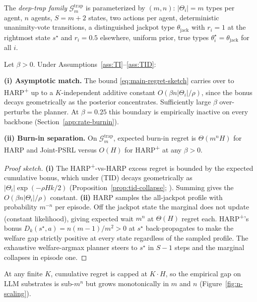 The \emph{deep-trap family} $\mathcal G_m^{\mathrm{trap}}$ is parameterized by $(m,n)$: $|\Theta_i|=m$ types per agent, $n$ agents, $S = m+2$ states, two actions per agent, deterministic unanimity-vote transitions, a distinguished jackpot type $\theta_{\mathrm{jack}}$ with $r_i = 1$ at the rightmost state $s^\star$ and $r_i = 0.5$ elsewhere, uniform prior, true types $\theta_i^\star = \theta_{\mathrm{jack}}$ for all $i$.

\begin{theorem}
\label{thm:pact-plus-app}
Let $\beta > 0$. Under Assumptions~\ref{ass:TI}--\ref{ass:TID}:

\textbf{(i) Asymptotic match.} The bound \eqref{eq:main-regret-sketch} carries over to HARP\textsuperscript{+} up to a $K$-independent additive constant $O(\beta n|\Theta_i|/\rho)$, since the bonus decays geometrically as the posterior concentrates. Sufficiently large $\beta$ over-perturbs the planner. At $\beta = 0.25$ this boundary is empirically inactive on every backbone (Section~\ref{app:rate-burnin}).

\textbf{(ii) Burn-in separation.} On $\mathcal G_m^{\mathrm{trap}}$, expected burn-in regret is $\Theta(m^n H)$ for HARP and Joint-PSRL versus $O(H)$ for HARP\textsuperscript{+} at any $\beta > 0$.
\end{theorem}

\begin{proof}[Proof sketch]
\textbf{(i)} The HARP\textsuperscript{+}-vs-HARP excess regret is bounded by the expected cumulative bonus, which under (TID) decays geometrically as $|\Theta_i|\exp(-\rho H k/2)$ (Proposition~\ref{prop:tid-collapse}; \citealp{ghosal2017fundamentals}). Summing gives the $O(\beta n|\Theta_i|/\rho)$ constant. \textbf{(ii)} HARP samples the all-jackpot profile with probability $m^{-n}$ per episode. Off the jackpot state the marginal does not update (constant likelihood), giving expected wait $m^n$ at $\Theta(H)$ regret each. HARP\textsuperscript{+}'s bonus $D_k(s^\star,a) = n(m-1)/m^2 > 0$ at $s^\star$ back-propagates to make the welfare gap strictly positive at every state regardless of the sampled profile. The exhaustive welfare-argmax planner steers to $s^\star$ in $S{-}1$ steps and the marginal collapses in episode one.
\end{proof}

At any finite $K$, cumulative regret is capped at $K\cdot H$, so the empirical gap on LLM substrates is sub-$m^n$ but grows monotonically in $m$ and $n$ (Figure~\ref{fig:n-scaling}).

